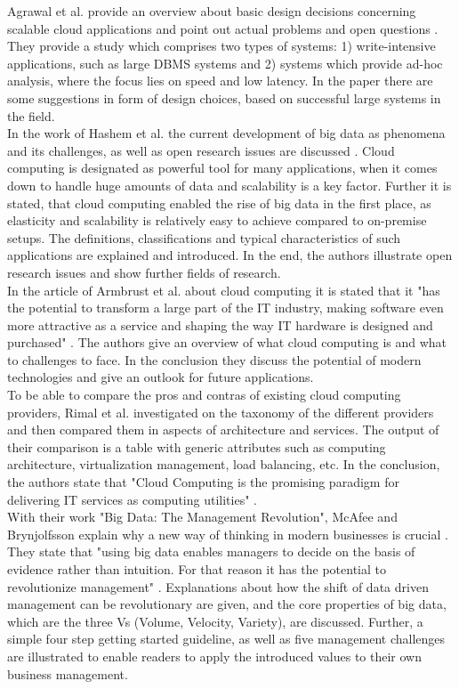 Agrawal et al. provide an overview about basic design decisions concerning scalable cloud applications and point out actual problems and open questions \cite{agrawal2011big}.
They provide a study which comprises two types of systems: 1) write-intensive applications, such as large DBMS systems and 2) systems which provide ad-hoc analysis, where the focus lies on speed and low latency.
In the paper there are some suggestions in form of design choices, based on successful large systems in the field.\\
In the work of Hashem et al. the current development of big data as phenomena and its challenges, as well as open research issues are discussed \cite{hashem2015rise}.
Cloud computing is designated as powerful tool for many applications, when it comes down to handle huge amounts of data and scalability is a key factor.
Further it is stated, that cloud computing enabled the rise of big data in the first place, as elasticity and scalability is relatively easy to achieve compared to on-premise setups.
The definitions, classifications and typical characteristics of such applications are explained and introduced.
In the end, the authors illustrate open research issues and show further fields of research.\\
In the article of Armbrust et al. about cloud computing it is stated that it "has the potential to transform a large part of the IT industry, making software even more attractive as a service and shaping the way IT hardware is designed and purchased" \cite{armbrust2010view}.
The authors give an overview of what cloud computing is and what to challenges to face.
In the conclusion they discuss the potential of modern technologies and give an outlook for future applications.\\
To be able to compare the pros and contras of existing cloud computing providers, Rimal et al. investigated on the taxonomy of the different providers and then compared them in aspects of architecture and services.
The output of their comparison is a table with generic attributes such as computing architecture, virtualization management, load balancing, etc.
In the conclusion, the authors state that "Cloud Computing is the promising paradigm for delivering IT services as computing utilities" \cite{rimal2009taxonomy}.\\

With their work "Big Data: The Management Revolution", McAfee and Brynjolfsson explain why a new way of thinking in modern businesses is crucial \cite{mcafee2012big}.
They state that "using big data enables managers to decide on the basis of evidence rather than intuition.
For that reason it has the potential to revolutionize management" \cite{mcafee2012big}.
Explanations about how the shift of data driven management can be revolutionary are given, and the core properties of big data, which are the three Vs (Volume, Velocity, Variety), are discussed.
Further, a simple four step getting started guideline, as well as five management challenges are illustrated to enable readers to apply the introduced values to their own business management.\\

